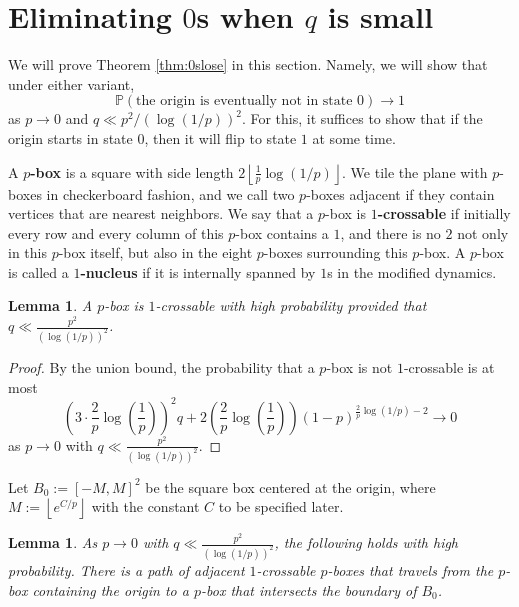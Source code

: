 \documentclass{article}
\renewcommand{\P}{\mathbb{P}}
\newcommand{\floor}[1]{\left\lfloor#1\right \rfloor}
\numberwithin{equation}{section}
\newtheorem{lemma}[theorem]{Lemma}
\begin{document}
 


\section{Eliminating $0$s when $q$ is small}\label{sec:eliminate-0s}

We will prove Theorem \ref{thm:0slose} in this section.
Namely, we will show that under either variant, 
\[
\P(\text{the origin is eventually not in state 0}) \to 1
\]
as $p \to 0$ and $q \ll p^2/(\log(1/p))^2$. 
For this, it suffices to show that if the origin starts in state $0$, then it will flip to state $1$ at some time.

A \textbf{$p$-box} is a square with side length $2\floor{\frac{1}{p}\log(1/p)}$. We tile the plane with $p$-boxes in checkerboard fashion, and we call two $p$-boxes adjacent if they contain vertices that are nearest neighbors.
We say that a $p$-box is \textbf{$1$-crossable} if initially every row and every column of this $p$-box contains a $1$, and there is no $2$ not only in this $p$-box itself, but also in the eight $p$-boxes surrounding this $p$-box.
A $p$-box is called a \textbf{$1$-nucleus} if it is internally spanned by $1$s in the modified dynamics.

\begin{lemma}\label{lem:p-boxcrossablewhp}
    A $p$-box is $1$-crossable with high probability provided that $q \ll \frac{p^2}{(\log(1/p))^2}$.
\end{lemma}
\begin{proof}
    By the union bound, the probability that a $p$-box is not $1$-crossable is at most
    \[
    \left(3\cdot \frac{2}{p}\log\left(\frac{1}{p}\right)\right)^2 q + 2\left(\frac{2}{p}\log\left(\frac{1}{p}\right)\right)(1 - p)^{\frac{2}{p}\log(1/p) - 2} \to 0
    \]
    as $p \to 0$ with $q \ll \frac{p^2}{(\log(1/p))^2}$.
\end{proof}
Let $B_0 := [-M, M]^2$ be the square box centered at the origin, where $M := \floor{e^{C/p}}$ with the constant $C$ to be specified later. 

\begin{lemma}\label{lem:highway}
    As $p \to 0$ with $q \ll \frac{p^2}{(\log(1/p))^2}$, the following holds with high probability. 
    There is a path of adjacent $1$-crossable $p$-boxes that travels from the $p$-box containing the origin to a $p$-box that intersects the boundary of $B_0$.
\end{lemma}
\end{document}
